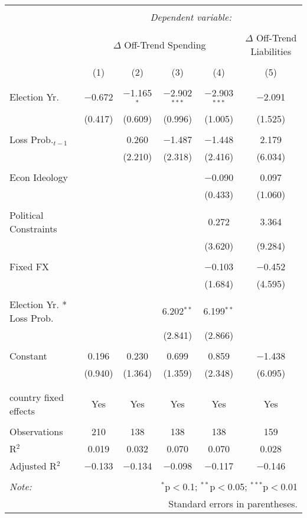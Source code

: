 
\begingroup 
\tiny 
\begin{tabular}{@{\extracolsep{5pt}}lccccc} 
\\[-1.8ex]\hline 
\hline \\[-1.8ex] 
 & \multicolumn{5}{c}{\textit{Dependent variable:}} \\ 
\cline{2-6} 
\\[-1.8ex] & \multicolumn{4}{c}{$\Delta$ Off-Trend Spending} & $\Delta$ Off-Trend Liabilities \\ 
\\[-1.8ex] & (1) & (2) & (3) & (4) & (5)\\ 
\hline \\[-1.8ex] 
 Election Yr. & $-$0.672 & $-$1.165$^{*}$ & $-$2.902$^{***}$ & $-$2.903$^{***}$ & $-$2.091 \\ 
  & (0.417) & (0.609) & (0.996) & (1.005) & (1.525) \\ 
  & & & & & \\ 
 Loss Prob.$_{t-1}$ &  & 0.260 & $-$1.487 & $-$1.448 & 2.179 \\ 
  &  & (2.210) & (2.318) & (2.416) & (6.034) \\ 
  & & & & & \\ 
 Econ Ideology &  &  &  & $-$0.090 & 0.097 \\ 
  &  &  &  & (0.433) & (1.060) \\ 
  & & & & & \\ 
 Political Constraints &  &  &  & 0.272 & 3.364 \\ 
  &  &  &  & (3.620) & (9.284) \\ 
  & & & & & \\ 
 Fixed FX &  &  &  & $-$0.103 & $-$0.452 \\ 
  &  &  &  & (1.684) & (4.595) \\ 
  & & & & & \\ 
 Election Yr. * Loss Prob. &  &  & 6.202$^{**}$ & 6.199$^{**}$ &  \\ 
  &  &  & (2.841) & (2.866) &  \\ 
  & & & & & \\ 
 Constant & 0.196 & 0.230 & 0.699 & 0.859 & $-$1.438 \\ 
  & (0.940) & (1.364) & (1.359) & (2.348) & (6.095) \\ 
  & & & & & \\ 
\hline \\[-1.8ex] 
country fixed effects & Yes & Yes & Yes & Yes & Yes \\ 
\hline \\[-1.8ex] 
Observations & 210 & 138 & 138 & 138 & 159 \\ 
R$^{2}$ & 0.019 & 0.032 & 0.070 & 0.070 & 0.028 \\ 
Adjusted R$^{2}$ & $-$0.133 & $-$0.134 & $-$0.098 & $-$0.117 & $-$0.146 \\ 
\hline 
\hline \\[-1.8ex] 
\textit{Note:}  & \multicolumn{5}{r}{$^{*}$p$<$0.1; $^{**}$p$<$0.05; $^{***}$p$<$0.01} \\ 
 & \multicolumn{5}{r}{Standard errors in parentheses.} \\ 
\end{tabular} 
\endgroup 

